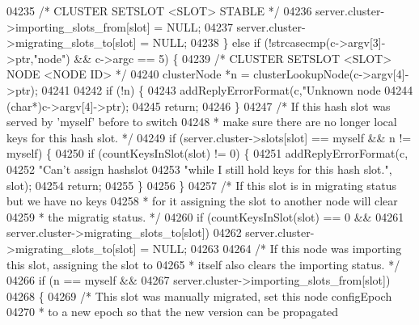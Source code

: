\begin{DoxyCode}
{{{{{{{{{{{{{{{{{{{{{{{{{{{{{{{{{{{{{{{{{{{{{{{{{{{{{{{{{{{{{{{{{{{{{{{{{{{{{{{{{04235             \textcolor{comment}{/* CLUSTER SETSLOT <SLOT> STABLE */}
04236             server.cluster->importing\_slots\_from[slot] = NULL;
04237             server.cluster->migrating\_slots\_to[slot] = NULL;
04238         \} \textcolor{keywordflow}{else} \textcolor{keywordflow}{if} (!strcasecmp(c->argv[3]->ptr,\textcolor{stringliteral}{"node"}) && c->argc == 5) \{
04239             \textcolor{comment}{/* CLUSTER SETSLOT <SLOT> NODE <NODE ID> */}
04240             clusterNode *n = clusterLookupNode(c->argv[4]->ptr);
04241 
04242             \textcolor{keywordflow}{if} (!n) \{
04243                 addReplyErrorFormat(c,\textcolor{stringliteral}{"Unknown node %
04244                     (\textcolor{keywordtype}{char}*)c->argv[4]->ptr);
04245                 \textcolor{keywordflow}{return};
04246             \}
04247             \textcolor{comment}{/* If this hash slot was served by 'myself' before to switch}
04248 \textcolor{comment}{             * make sure there are no longer local keys for this hash slot. */}
04249             \textcolor{keywordflow}{if} (server.cluster->slots[slot] == myself && n != myself) \{
04250                 \textcolor{keywordflow}{if} (countKeysInSlot(slot) != 0) \{
04251                     addReplyErrorFormat(c,
04252                         \textcolor{stringliteral}{"Can't assign hashslot %
04253                         \textcolor{stringliteral}{"while I still hold keys for this hash slot."}, slot);
04254                     \textcolor{keywordflow}{return};
04255                 \}
04256             \}
04257             \textcolor{comment}{/* If this slot is in migrating status but we have no keys}
04258 \textcolor{comment}{             * for it assigning the slot to another node will clear}
04259 \textcolor{comment}{             * the migratig status. */}
04260             \textcolor{keywordflow}{if} (countKeysInSlot(slot) == 0 &&
04261                 server.cluster->migrating\_slots\_to[slot])
04262                 server.cluster->migrating\_slots\_to[slot] = NULL;
04263 
04264             \textcolor{comment}{/* If this node was importing this slot, assigning the slot to}
04265 \textcolor{comment}{             * itself also clears the importing status. */}
04266             \textcolor{keywordflow}{if} (n == myself &&
04267                 server.cluster->importing\_slots\_from[slot])
04268             \{
04269                 \textcolor{comment}{/* This slot was manually migrated, set this node configEpoch}
04270 \textcolor{comment}{                 * to a new epoch so that the new version can be propagated}
}}}}}}}}}}}}}}}}}}}}}}}}}}}}}}}}}}}}}}}}}}}}}}}}}}}}}}}}}}}}}}}}}}}}}}}}}}}}}}}}}}}
\end{DoxyCode}
